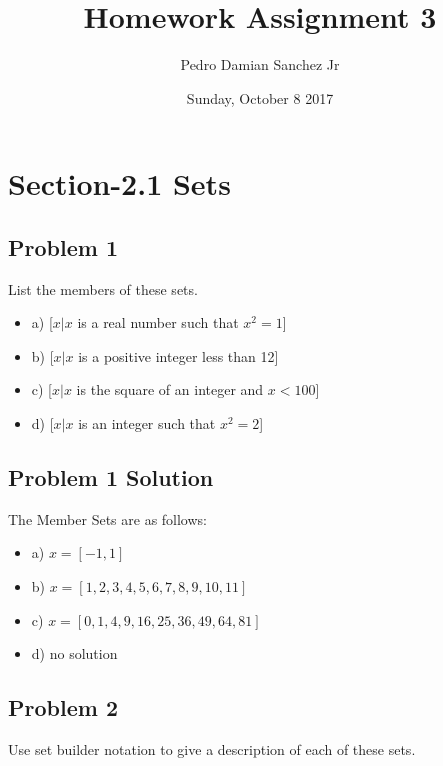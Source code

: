 \documentclass[11pt]{article}
\title{\bf Homework Assignment 3}
\date{Sunday, October 8 2017}
\author{ Pedro Damian Sanchez Jr}
\begin{document}
\maketitle

\section{Section-2.1 Sets}

\subsection{Problem 1}

List the members of these sets.
\begin{itemize}
\item a) [$x | x$ is a real number such that $x^2 = 1$] \\
\item b) [$x | x$ is a positive integer less than 12] \\
\item c) [$x | x$ is the square of an integer and $x < 100$] \\
\item d) [$x | x$ is an integer such that $x^2 = 2$] \\
\end{itemize}

\subsection{Problem 1 Solution}

The Member Sets are as follows:
\begin{itemize}
\item a) $x = [-1, 1]$ \\
\item b) $x = [1, 2, 3, 4, 5, 6, 7, 8, 9, 10, 11]$ \\
\item c) $x = [0, 1, 4, 9, 16, 25, 36, 49, 64, 81]$ \\
\item d) no solution \\
\end{itemize}

\subsection{Problem 2}

Use set builder notation to give a description of each of these sets.
\end{document}
